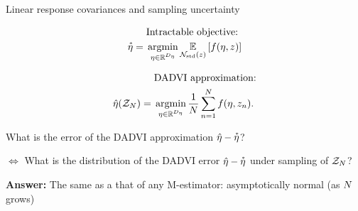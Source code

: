 




\begin{frame}{Linear response covariances and sampling uncertainty}
    
    
    
    \vspace{-2em}
    
    \begin{minipage}[t]{0.48\textwidth}
        \begin{align*}
            &\text{Intractable objective:} 
            \\ \etastar %
                ={}& 
                \argmin_{\eta \in \etadom} \expect{\normz}{f(\eta, \z)}
        \end{align*}    
    \end{minipage}
    \begin{minipage}[t]{0.48\textwidth}
        \begin{align*}
            &\text{DADVI approximation:} 
            \\ \etahat(\Z) %
             ={}&  \argmin_{\eta \in \etadom} \meann f(\eta, \z_n).
        \end{align*}
    \end{minipage}
    
    
    \hrulefill
    
    What is the error of the DADVI approximation $\hat{\eta} - \accentset{*}{\eta}$?
    
    \pause
    
    $\Leftrightarrow$ What is the distribution of the
    DADVI error $\hat{\eta} - \accentset{*}{\eta}$ under sampling of $\mathcal{Z}_{N}$?
    
    \textbf{Answer: } The same as a that of any M-estimator: 
        asymptotically normal (as $N$ grows) 
    

\end{frame}
